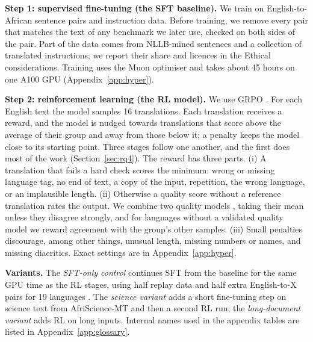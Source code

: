 \textbf{Step 1: supervised fine-tuning (the SFT baseline).} We train on English-to-African sentence pairs and instruction data. Before training, we remove every pair that matches the text of any benchmark we later use, checked on both sides of the pair. Part of the data comes from NLLB-mined sentences and a collection of translated instructions; we report their share and licences in the Ethical considerations. Training uses the Muon optimiser \citep{liu2025muon} and takes about 45 hours on one A100 GPU (Appendix~\ref{app:hyper}).

\textbf{Step 2: reinforcement learning (the RL model).} We use GRPO \citep{shao2024deepseekmath}. For each English text the model samples 16 translations. Each translation receives a reward, and the model is nudged towards translations that score above the average of their group and away from those below it; a penalty keeps the model close to its starting point. Three stages follow one another, and the first does most of the work (Section~\ref{sec:rq4}). The reward has three parts. (i) A translation that fails a hard check scores the minimum: wrong or missing language tag, no end of text, a copy of the input, repetition, the wrong language, or an implausible length. (ii) Otherwise a quality score without a reference translation rates the output. We combine two quality models \citep{wang2024africomet,li2025ssacomet}, taking their mean unless they disagree strongly, and for languages without a validated quality model we reward agreement with the group's other samples. (iii) Small penalties discourage, among other things, unusual length, missing numbers or names, and missing diacritics. Exact settings are in Appendix~\ref{app:hyper}.

\textbf{Variants.} The \emph{SFT-only control} continues SFT from the baseline for the same GPU time as the RL stages, using half replay data and half extra English-to-X pairs for 19 languages \citep{gritta2026translatepsy}. The \emph{science variant} adds a short fine-tuning step on science text from AfriScience-MT \citep{abdulmumin2026afriscience} and then a second RL run; the \emph{long-document variant} adds RL on long inputs. Internal names used in the appendix tables are listed in Appendix~\ref{app:glossary}.
